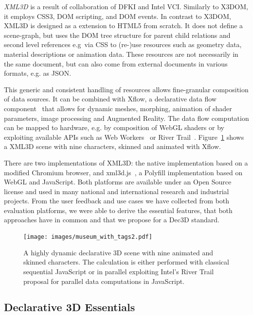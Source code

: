 \documentclass{acmsiggraph}
\begin{document}
\emph{XML3D} \cite{Sons2010} is a result of collaboration of DFKI and Intel VCI. Similarly to X3DOM, it employs CSS3, DOM scripting, and DOM events. In contrast to X3DOM, XML3D is designed as a extension to HTML5 from scratch. It does not define a scene-graph, but uses the DOM tree structure for parent child relations and second level references e.g\ via CSS to (re-)use resources such as geometry data, material descriptions or animation data. These resources are not necessarily in the same document, but can also come from external documents in various formats, e.g. as JSON.

This generic and consistent handling of resources allows fine-granular composition of data sources. It can be combined with Xflow, a declarative data flow component~\cite{KleinSJRSB12} that allows for dynamic meshes, morphing, animation of shader parameters, image processing and Augmented Reality. The data flow computation can be mapped to hardware, e.g. by composition of WebGL shaders or by exploiting available APIs such as Web Workers~\cite{w3c:webworkers} or River Trail~\cite{Herhut:2012}. Figure~\ref{fig:xflow} shows a XML3D scene with nine characters, skinned and animated with Xflow.

There are two implementations of XML3D: the native implementation based on a  modified Chromium browser, and xml3d.js~\cite{sons:2013}, a Polyfill implementation based on WebGL and JavaScript. Both platforms are available under an Open Source license and used in many national and international research and industrial projects. From the user feedback and use cases we have collected from both evaluation platforms, we were able to derive the essential features, that both approaches have in common and that we propose for a Dec3D standard.

\begin{figure}
  \centering
  \texttt{[image: images/museum\_with\_tags2.pdf]}
  \caption{A highly dynamic declarative 3D scene with nine animated and skinned characters. The calculation is either performed with classical sequential JavaScript or in parallel exploiting Intel's River Trail proposal for parallel data computations in JavaScript.}
  \label{fig:xflow}
  \vspace{-0.2cm}
\end{figure}


\subsection{Declarative 3D Essentials}
\label{subsection:essentials}
\end{document}

